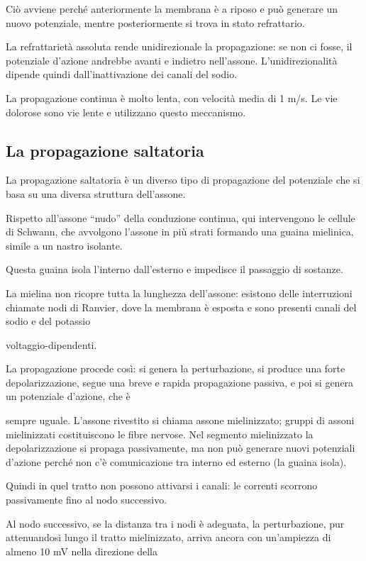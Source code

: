 \documentclass[12pt,a4paper,openany]{book}
\begin{document}
Ciò avviene perché anteriormente la membrana è a riposo e può generare un nuovo potenziale, mentre posteriormente si trova in stato refrattario.

La refrattarietà assoluta rende unidirezionale la propagazione: se non ci fosse, il potenziale d'azione andrebbe avanti e indietro nell'assone. L'unidirezionalità dipende quindi dall'inattivazione dei canali del sodio.

La propagazione continua è molto lenta, con velocità media di 1 m/s. Le vie dolorose sono vie lente e utilizzano questo meccanismo.


\subsection{La propagazione saltatoria}

La propagazione saltatoria è un diverso tipo di propagazione del potenziale che si basa su una diversa struttura dell'assone.

Rispetto all'assone ``nudo'' della conduzione continua, qui intervengono le cellule di Schwann, che avvolgono l'assone in più strati formando una guaina mielinica, simile a un nastro isolante.

Questa guaina isola l'interno dall'esterno e impedisce il passaggio di sostanze.

La mielina non ricopre tutta la lunghezza dell'assone: esistono delle interruzioni chiamate nodi di Ranvier, dove la membrana è esposta e sono presenti canali del sodio e del potassio

voltaggio-dipendenti.

La propagazione procede così: si genera la perturbazione, si produce una forte depolarizzazione, segue una breve e rapida propagazione passiva, e poi si genera un potenziale d'azione, che è

sempre uguale. L'assone rivestito si chiama assone mielinizzato; gruppi di assoni mielinizzati costituiscono le fibre nervose. Nel segmento mielinizzato la depolarizzazione si propaga passivamente, ma non può generare nuovi potenziali d'azione perché non c'è comunicazione tra interno ed esterno (la guaina isola).

Quindi in quel tratto non possono attivarsi i canali: le correnti scorrono passivamente fino al nodo successivo.

Al nodo successivo, se la distanza tra i nodi è adeguata, la perturbazione, pur attenuandosi lungo il tratto mielinizzato, arriva ancora con un'ampiezza di almeno 10 mV nella direzione della
\end{document}
